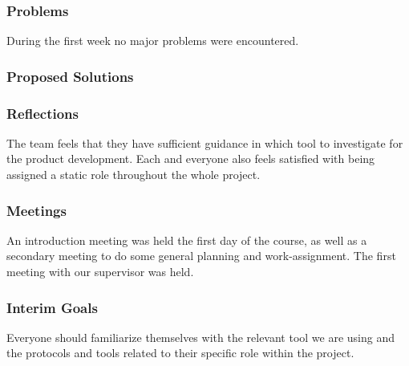 \subsubsection{Problems}
    During the first week no major problems were encountered.

\subsubsection{Proposed Solutions}


\subsubsection{Reflections}
    The team feels that they have sufficient guidance in which tool to investigate for the product development. Each and everyone also feels satisfied with being assigned a static role throughout the whole project.

\subsubsection{Meetings}
    An introduction meeting was held the first day of the course, as well as a secondary meeting to do some general planning and work-assignment. The first meeting with our supervisor was held.

\subsubsection{Interim Goals}
    Everyone should familiarize themselves with the relevant tool we are using and the protocols and tools related to their specific role within the project.  

